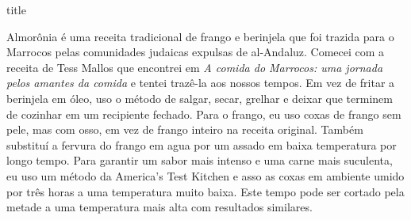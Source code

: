 \documentclass [11pt, papel de carta] {article}
\begin{document}
 {title}

Almor\^onia é uma receita tradicional de frango e berinjela que foi trazida para o Marrocos pelas comunidades judaicas expulsas de al-Andaluz. Comecei com a receita de Tess Mallos que encontrei em {\it A comida do Marrocos: uma jornada pelos amantes da comida} e tentei trazê-la aos nossos tempos. Em vez de fritar a berinjela em óleo, uso o método de salgar, secar, grelhar e deixar que terminem de cozinhar em um recipiente fechado. Para o frango, eu uso coxas de frango sem pele, mas com osso, em vez de frango inteiro na receita original. Também substituí a fervura do frango em agua por um assado em baixa temperatura por longo tempo. Para garantir um sabor mais intenso e uma carne mais suculenta, eu uso um método da America's Test Kitchen e asso as coxas em ambiente umido por três horas a uma temperatura muito baixa. Este tempo pode ser cortado pela metade a uma temperatura mais alta com resultados similares.
\end{document}
